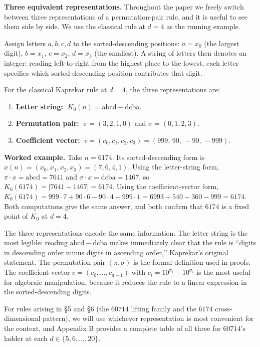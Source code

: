 \documentclass[11pt,letterpaper]{article}
\theoremstyle{paperstyle}
\theoremstyle{paperstyledef}
\theoremstyle{paperstylerem}
\begin{document}
\textbf{Three equivalent representations.} Throughout the paper we
freely switch between three representations of a permutation-pair rule,
and it is useful to see them side by side. We use the classical rule at
\(d = 4\) as the running example.

Assign letters \(a, b, c, d\) to the sorted-descending positions:
\(a = x_0\) (the largest digit), \(b = x_1\), \(c = x_2\), \(d = x_3\)
(the smallest). A string of letters then denotes an integer: reading
left-to-right from the highest place to the lowest, each letter
specifies which sorted-descending position contributes that digit.

For the classical Kaprekar rule at \(d = 4\), the three representations
are:

\begin{enumerate}
\def\labelenumi{(\roman{enumi})}
\item
  \textbf{Letter string:} \(\;K_0(n) = \mathrm{abcd} - \mathrm{dcba}\).
\item
  \textbf{Permutation pair:} \(\;\pi = (3, 2, 1, 0)\) and
  \(\sigma = (0, 1, 2, 3)\).
\item
  \textbf{Coefficient vector:}
  \(\;c = (c_0, c_1, c_2, c_3) = (999, \, 90, \, -90, \, -999)\).
\end{enumerate}

\textbf{Worked example.} Take \(n = 6174\). Its sorted-descending form
is \(x(n) = (x_0, x_1, x_2, x_3) = (7, 6, 4, 1)\). Using the
letter-string form, \(\pi \cdot x = \mathrm{abcd} = 7641\) and
\(\sigma \cdot x = \mathrm{dcba} = 1467\), so
\(K_0(6174) = |7641 - 1467| = 6174\). Using the coefficient-vector form,
\(K_0(6174) = 999 \cdot 7 + 90 \cdot 6 - 90 \cdot 4 - 999 \cdot 1 = 6993 + 540 - 360 - 999 = 6174\).
Both computations give the same answer, and both confirm that \(6174\)
is a fixed point of \(K_0\) at \(d = 4\).

The three representations encode the same information. The letter string
is the most legible: reading \(\mathrm{abcd} - \mathrm{dcba}\) makes
immediately clear that the rule is ``digits in descending order minus
digits in ascending order,'' Kaprekar's original statement. The
permutation pair \((\pi, \sigma)\) is the formal definition used in
proofs. The coefficient vector \(c = (c_0, \ldots, c_{d-1})\) with
\(c_i = 10^{\pi_i} - 10^{\sigma_i}\) is the most useful for algebraic
manipulation, because it reduces the rule to a linear expression in the
sorted-descending digits.

For rules arising in §5 and §6 (the \(60714\) lifting family and the
\(6174\) cross-dimensional pattern), we will use whichever
representation is most convenient for the context, and Appendix B
provides a complete table of all three for \(60714\)'s ladder at each
\(d \in \{5, 6, \ldots, 20\}\).
\end{document}
